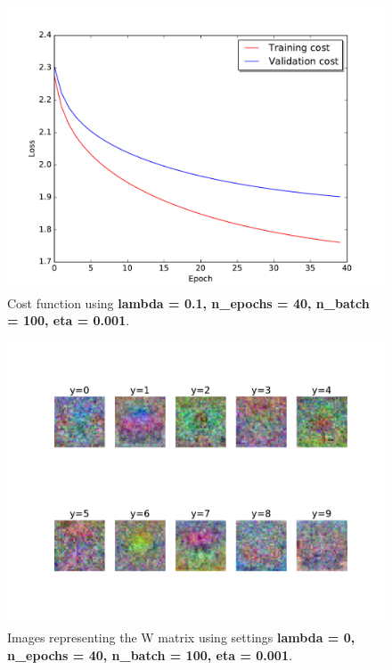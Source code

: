\documentclass{article}
\begin{document}
\begin{figure}[H]
\centering
  \includegraphics[width = 12cm]{../Result_pics/thirdCost2.pdf}
\caption{Cost function using \textbf{lambda = 0.1, n\_epochs = 40, n\_batch = 100, eta = 0.001}. }
\label{fig:thirdCost}
\end{figure}

\begin{figure}[H]
\centering
  \includegraphics[width = 12cm]{../Result_pics/thirdW2.pdf}
\caption{Images representing the W matrix using settings \textbf{lambda = 0, n\_epochs = 40, n\_batch = 100, eta = 0.001}.}
\label{fig:thirdW}
\end{figure}
\end{document}
